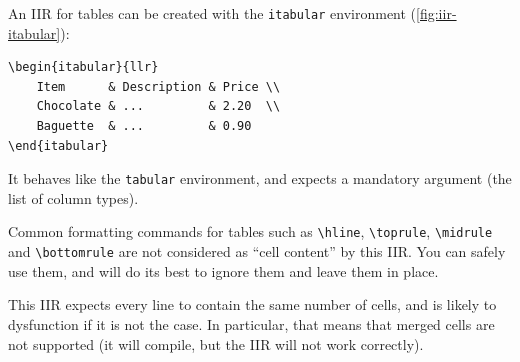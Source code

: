 An IIR for tables can be created with the \texttt{itabular} environment (\autoref{fig:iir-itabular}):

\begin{lstlisting}[style=custom-latex]
\begin{itabular}{llr}
    Item      & Description & Price \\
    Chocolate & ...         & 2.20  \\
    Baguette  & ...         & 0.90
\end{itabular}
\end{lstlisting}

It behaves like the \texttt{tabular} environment, and expects a mandatory argument (the list of column types).


\begin{info}
    Common formatting commands for tables such as \verb|\hline|, \verb|\toprule|, \verb|\midrule| and \verb|\bottomrule| are not considered as ``cell content'' by this IIR. You can safely use them, and \iLaTeX{} will do its best to ignore them and leave them in place.
\end{info}

\begin{warning}
    This IIR expects every line to contain the same number of cells, and is likely to dysfunction if it is not the case.
    In particular, that means that merged cells are not supported (it will compile, but the IIR will not work correctly).
\end{warning}


